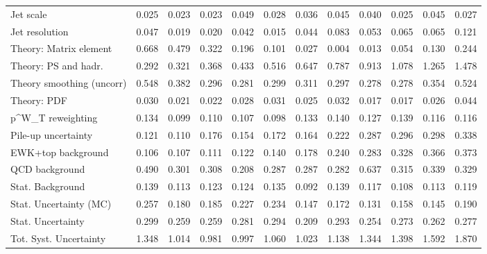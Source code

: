 \begin{tabular}{l|p{0.6cm}p{0.6cm}p{0.6cm}p{0.6cm}p{0.6cm}p{0.6cm}p{0.6cm}p{0.6cm}p{0.6cm}p{0.6cm}p{0.6cm}}
Jet scale                                & 0.025 & 0.023 & 0.023 & 0.049 & 0.028 & 0.036 & 0.045 & 0.040 & 0.025 & 0.045 & 0.027 \\
Jet resolution                           & 0.047 & 0.019 & 0.020 & 0.042 & 0.015 & 0.044 & 0.083 & 0.053 & 0.065 & 0.065 & 0.121 \\
Theory: Matrix element                   & 0.668 & 0.479 & 0.322 & 0.196 & 0.101 & 0.027 & 0.004 & 0.013 & 0.054 & 0.130 & 0.244 \\
Theory: PS and hadr.                     & 0.292 & 0.321 & 0.368 & 0.433 & 0.516 & 0.647 & 0.787 & 0.913 & 1.078 & 1.265 & 1.478 \\
Theory smoothing (uncorr)                & 0.548 & 0.382 & 0.296 & 0.281 & 0.299 & 0.311 & 0.297 & 0.278 & 0.278 & 0.354 & 0.524 \\
Theory: PDF                              & 0.030 & 0.021 & 0.022 & 0.028 & 0.031 & 0.025 & 0.032 & 0.017 & 0.017 & 0.026 & 0.044 \\
p^{W}_{T} reweighting                    & 0.134 & 0.099 & 0.110 & 0.107 & 0.098 & 0.133 & 0.140 & 0.127 & 0.139 & 0.116 & 0.116 \\
Pile-up uncertainty                      & 0.121 & 0.110 & 0.176 & 0.154 & 0.172 & 0.164 & 0.222 & 0.287 & 0.296 & 0.298 & 0.338 \\
EWK+top background                       & 0.106 & 0.107 & 0.111 & 0.122 & 0.140 & 0.178 & 0.240 & 0.283 & 0.328 & 0.366 & 0.373 \\
QCD background                           & 0.490 & 0.301 & 0.308 & 0.208 & 0.287 & 0.287 & 0.282 & 0.637 & 0.315 & 0.339 & 0.329 \\
Stat. Background                         & 0.139 & 0.113 & 0.123 & 0.124 & 0.135 & 0.092 & 0.139 & 0.117 & 0.108 & 0.113 & 0.119 \\
Stat. Uncertainty (MC)                   & 0.257 & 0.180 & 0.185 & 0.227 & 0.234 & 0.147 & 0.172 & 0.131 & 0.158 & 0.145 & 0.190 \\
\hline
Stat. Uncertainty                        & 0.299 & 0.259 & 0.259 & 0.281 & 0.294 & 0.209 & 0.293 & 0.254 & 0.273 & 0.262 & 0.277 \\
\hline
Tot. Syst. Uncertainty                   & 1.348 & 1.014 & 0.981 & 0.997 & 1.060 & 1.023 & 1.138 & 1.344 & 1.398 & 1.592 & 1.870 \\
\hline
\end{tabular}
